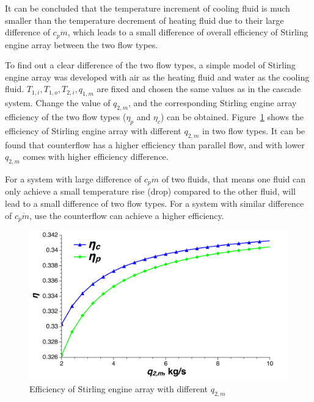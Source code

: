 It can be concluded that the temperature increment of cooling fluid is much smaller than the temperature decrement of heating fluid due to their large difference of $c_p\dot{m}$, which leads to a small difference of overall efficiency of Stirling engine array between the two flow types.

To find out a clear difference of the two flow types, a simple model of Stirling engine array was developed with air as the heating fluid and water as the cooling fluid. $T_{1,i}, T_{1,o}, T_{2,i}, q_{1,m}$ are fixed and chosen the same values as in the cascade system. Change the value of $q_{2,m}$, and the corresponding Stirling engine array efficiency of the two flow types ($\eta_p$ and $\eta_c$) can be obtained. Figure~\ref{fig:SEAflowtypes} shows the efficiency of Stirling engine array with different $q_{2,m}$ in two flow types. It can be found that counterflow has a higher efficiency than parallel flow, and with lower $q_{2,m}$ comes with higher efficiency difference.

For a system with large difference of $c_p\dot{m}$ of two fluids, that means one fluid can only achieve a small temperature rise (drop) compared to the other fluid, will lead to a small difference of two flow types. For a system with similar difference of $c_p\dot{m}$, use the counterflow can achieve a higher efficiency.

\noindent \begin{figure}[H]
\begin{center}
	\includegraphics[width = 0.8\columnwidth, angle = 0]{fig/SEAflowtypes}
	\caption{Efficiency of Stirling engine array with different $q_{2,m}$}
	\label{fig:SEAflowtypes}
\end{center}
\end{figure}


